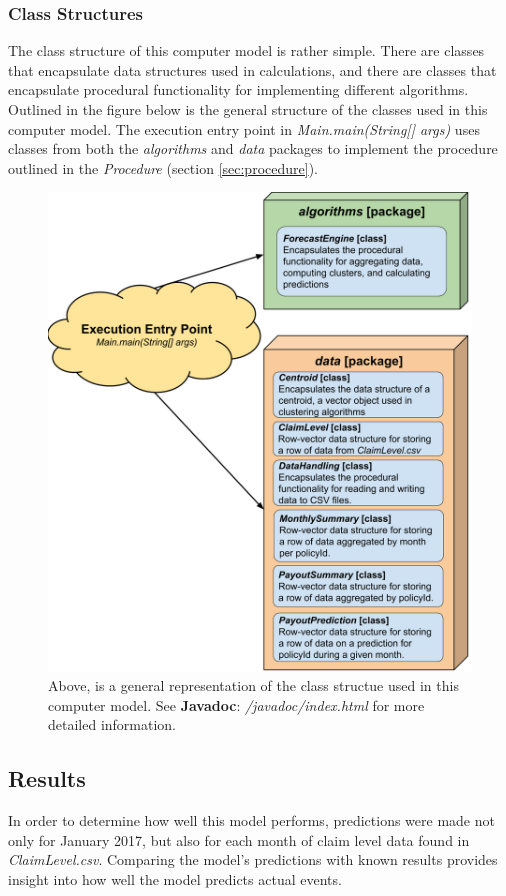 \documentclass[12pt,letterpaper,titlepage]{article}
\begin{document}
			\subsubsection{Class Structures}
			The class structure of this computer model is rather simple. There are classes that encapsulate data structures used in calculations, and there are classes that encapsulate procedural functionality for implementing different algorithms. Outlined in the figure below is the general structure of the classes used in this computer model. The execution entry point in \emph{Main.main(String[] \emph{args})} uses classes from both the \emph{algorithms} and \emph{data} packages to implement the procedure outlined in the \emph{Procedure} (section \ref{sec:procedure}).
			\begin{figure}[!ht]
				\centering
				\includegraphics[scale=0.36]{classStructures.png}
				\caption{Above, is a general representation of the class structue used in this computer model. See \textbf{Javadoc}: \emph{/javadoc/index.html} for more detailed information.}
				\label{fig:classStructures}
			\end{figure}
			
\newpage		
		\subsection{Results}
		In order to determine how well this model performs, predictions were made not only for January 2017, but also for each month of claim level data found in \emph{ClaimLevel.csv}. Comparing the model's predictions with known results provides insight into how well the model predicts actual events. 
			
\end{document}

